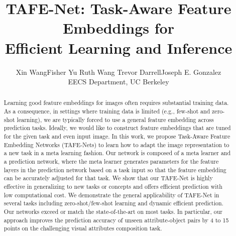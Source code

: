 \documentclass[10pt,twocolumn,letterpaper]{article}
\title{TAFE-Net: Task-Aware Feature Embeddings for \\ Efficient Learning and Inference}
\author{
  Xin Wang\quad Fisher Yu\quad 
  Ruth Wang\quad
  Trevor Darrell\quad Joseph E. Gonzalez \\
  EECS Department, UC Berkeley 
}
\newcommand{\model}{TAFE-Net\xspace}
\newcommand{\modelplural}{TAFE-Nets\xspace}
\begin{document}
\maketitle

\begin{abstract}
Learning good feature embeddings for images often requires substantial training data.
As a consequence, in settings where training data is limited (e.g., few-shot and zero-shot learning), we are typically forced to use a general feature embedding across prediction tasks.
Ideally, we would like to construct feature embeddings that are tuned for the given task and even input image.
In this work, we propose Task-Aware Feature Embedding Networks (\modelplural) to learn how to adapt the image representation to a new task in a meta learning fashion. 
Our network is composed of a meta learner and a prediction network, where the meta learner generates parameters for the feature layers in the prediction network based on a task input so that the feature embedding can be accurately adjusted
for that task.
We show that our \model is highly effective in generalizing to new tasks or concepts and offers efficient prediction with low computational cost. 
We demonstrate the general applicability of \model in several tasks including zero-shot/few-shot learning and dynamic efficient prediction. Our networks exceed or match the state-of-the-art on most tasks. In particular, our approach improves the prediction accuracy of unseen attribute-object pairs by 4 to 15 points on the challenging visual attributes composition task.
\end{abstract}
\end{document}
